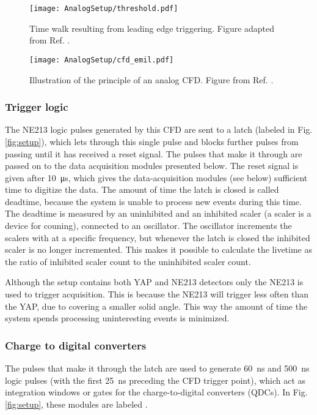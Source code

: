 \documentclass[main.tex]{subfiles}
\begin{document}
\begin{figure}[h]
    \centering
        \texttt{[image: AnalogSetup/threshold.pdf]}
        \caption[Time walk resulting from leading edge triggering]{Time walk resulting from leading edge triggering. Figure adapted from Ref. \cite{rofors}.}
    \label{fig:discriminator}
\end{figure}

\begin{figure}[h]
    \centering
        \texttt{[image: AnalogSetup/cfd\_emil.pdf]}
        \caption[CFD trigger principle]{Illustration of the principle of an analog CFD. Figure from Ref. \cite{rofors}.}
    \label{fig:cfd}
\end{figure}



\subsubsection{Trigger logic}
The NE213 logic pulses generated by this CFD are sent to a latch (labeled  in Fig. \ref{fig:setup}), which lets through this single pulse and blocks further pulses from passing until it has received a reset signal. The pulses that make it through are passed on to the data acquisition modules presented below. The reset signal is given after \SI{10}{\micro\second}, which gives the data-acquisition modules (see below) sufficient time to digitize the data. The amount of time the latch is closed is called deadtime, because the system is unable to process new events during this time. The deadtime is measured by an uninhibited and an inhibited scaler (a scaler is a device for couning), connected to an oscillator. The oscillator increments the scalers with at a specific frequency, but whenever the latch is closed the inhibited scaler is no longer incremented. This makes it possible to calculate the livetime as the ratio of inhibited scaler count to the uninhibited scaler count.

Although the setup contains both YAP and NE213 detectors only the NE213 is used to trigger acquisition. This is because the NE213 will trigger less often than the YAP, due to covering a smaller solid angle. This way the amount of time the system spends processing uninteresting events is minimized.

\subsubsection{Charge to digital converters}
The pulses that make it through the latch are used to generate \SI{60}{\ns} and \SI{500}{\ns} logic pulses (with the first \SI{25}{\ns} preceding the CFD trigger point), which act as integration windows or gates for the charge-to-digital converters (QDCs). In Fig. \ref{fig:setup}, these modules are labeled .
\end{document}
